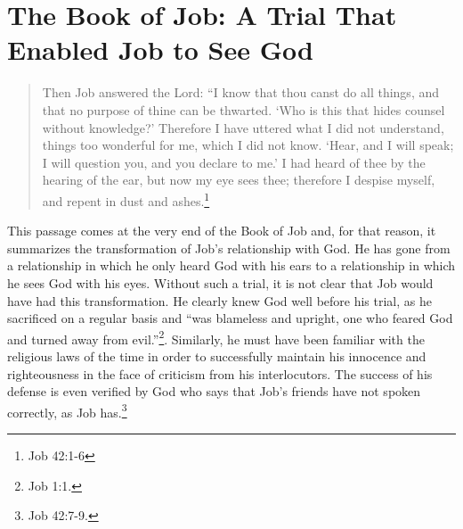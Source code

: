 \section{The Book of Job: A Trial That Enabled Job to See God}
\begin{quote}
\singlespacing
Then Job answered the Lord: ``I know that thou canst do all things, and that no purpose of thine can be thwarted. `Who is this that hides counsel without knowledge?' Therefore I have uttered what I did not understand, things too wonderful for me, which I did not know. `Hear, and I will speak; I will question you, and you declare to me.' I had heard of thee by the hearing of the ear, but now my eye sees thee; therefore I despise myself, and repent in dust and ashes.\footnote{Job 42:1-6} 
\end{quote}

This passage comes at the very end of the Book of Job and, for that reason, it summarizes the transformation of Job's relationship with God. He has gone from a relationship in which he only heard God with his ears to a relationship in which he sees God with his eyes. Without such a trial, it is not clear that Job would have had this transformation. He clearly knew God well before his trial, as he sacrificed on a regular basis and ``was blameless and upright, one who feared God and turned away from evil.''\footnote{Job 1:1.}. Similarly, he must have been familiar with the religious laws of the time in order to successfully maintain his innocence and righteousness in the face of criticism from his interlocutors. The success of his defense is even verified by God who says that Job's friends have not spoken correctly, as Job has.\footnote{Job 42:7-9.}

